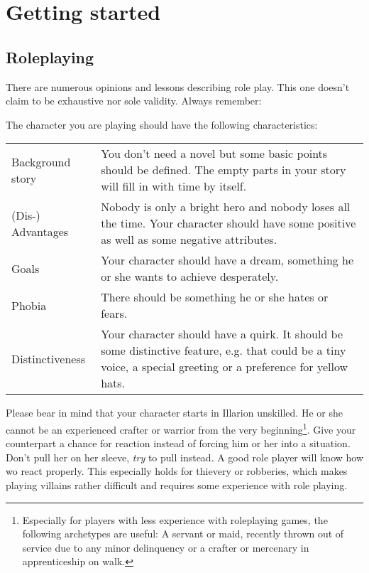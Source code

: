 \documentclass[a4paper,11pt]{scrreprt}
\begin{document}
\tableofcontents
\chapter{Getting started}
\section{Roleplaying}

There are numerous opinions and lessons describing role play. This one doesn't claim to be exhaustive nor sole validity. Always remember:
\begin{center}
\end{center}

The character you are playing should have the following characteristics: 
\begin{table}[h]
\begin{tabular}{ l p{12.5cm}}
Background story & You don't need a novel but some basic points should be 
defined. The empty parts in your story will fill in with time by 
itself. \\
(Dis-) Advantages & Nobody is only a bright hero and nobody loses all the 
time. Your character should have some positive as well as some negative attributes. \\
Goals & Your character should have a dream, something he or she 
wants to achieve desperately. \\
Phobia & There should be something he or she hates or fears. \\
Distinctiveness & Your character should have a quirk. It should be some distinctive feature, e.g. that could be a tiny voice, a 
special greeting or a preference for yellow hats. 
\end{tabular}
\end{table}

Please bear in mind that your character starts in Illarion unskilled. He or she cannot be an experienced crafter or warrior from the very beginning\footnote{Especially for players with less experience with roleplaying games, the following archetypes are useful: A servant or maid, recently thrown out of service due to any minor delinquency or a crafter or mercenary in apprenticeship on walk.}.
Give your counterpart a chance for reaction instead of forcing him or her into a situation. Don't pull her on her sleeve, \emph{try} to pull instead. A good role player will know how wo react properly. This especially holds for thievery or robberies, which makes playing villains rather difficult and requires some experience with role playing.
\end{document}

